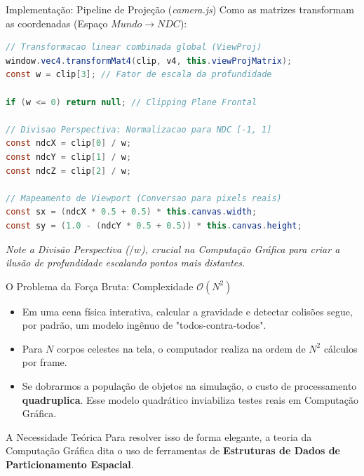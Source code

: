 \documentclass[10pt, aspectratio=169]{beamer}
\begin{document}
\begin{frame}[fragile]{Implementação: Pipeline de Projeção (\textit{camera.js})}
    Como as matrizes transformam as coordenadas (Espaço $Mundo \rightarrow NDC$):
\begin{lstlisting}[language=Java]
// Transformacao linear combinada global (ViewProj)
window.vec4.transformMat4(clip, v4, this.viewProjMatrix);
const w = clip[3]; // Fator de escala da profundidade

if (w <= 0) return null; // Clipping Plane Frontal

// Divisao Perspectiva: Normalizacao para NDC [-1, 1]
const ndcX = clip[0] / w;
const ndcY = clip[1] / w;
const ndcZ = clip[2] / w;

// Mapeamento de Viewport (Conversao para pixels reais)
const sx = (ndcX * 0.5 + 0.5) * this.canvas.width;
const sy = (1.0 - (ndcY * 0.5 + 0.5)) * this.canvas.height;
\end{lstlisting}
    \textit{Note a Divisão Perspectiva ($/w$), crucial na Computação Gráfica para criar a ilusão de profundidade escalando pontos mais distantes.}
\end{frame}

\begin{frame}{O Problema da Força Bruta: Complexidade $\mathcal{O}(N^2)$}
    \begin{itemize}
        \item Em uma cena física interativa, calcular a gravidade e detectar colisões segue, por padrão, um modelo ingênuo de "todos-contra-todos".
        \item Para $N$ corpos celestes na tela, o computador realiza na ordem de $N^2$ cálculos por frame.
        \item Se dobrarmos a população de objetos na simulação, o custo de processamento \textbf{quadruplica}. Esse modelo quadrático inviabiliza testes reais em Computação Gráfica.
    \end{itemize}
    
    \begin{block}{A Necessidade Teórica}
        Para resolver isso de forma elegante, a teoria da Computação Gráfica dita o uso de ferramentas de \textbf{Estruturas de Dados de Particionamento Espacial}.
    \end{block}
\end{frame}
\end{document}
